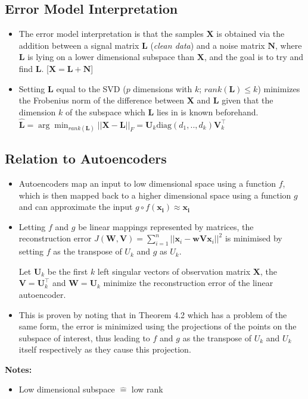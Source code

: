 \documentclass[english]{latex4ei/latex4ei_sheet}
\begin{document}
\begin{sectionbox}
\subsection{Error Model Interpretation}
\begin{itemize}
\item The error model interpretation is that the samples $\mathbf{X}$ is obtained via the addition between a signal matrix $\mathbf{L}$ (\emph{clean data}) and a noise matrix $\mathbf{N}$, where $\mathbf{L}$ is lying on a lower dimensional subspace than $\mathbf{X}$, and the goal is to try and find $\mathbf{L}$.
[$\mathbf{X}=\mathbf{L}+\mathbf{N}$]
\item Setting $\mathbf{L}$ equal to the SVD ($p$ dimensions with $k$; $rank(\mathbf{L})\le k$) minimizes the Frobenius norm of the difference between $\mathbf{X}$ and $\mathbf{L}$ given that the dimension $k$ of the subspace which $\mathbf{L}$ lies in is known beforehand. \\
$ \hat{\mathbf{L}}=\arg\min_{rank(\mathbf{L})}||\mathbf{X}-\mathbf{L}||_F=\mathbf{U}_k\mathrm{diag}(d_1,..,d_k)\mathbf{V}_k^{\top}$
\end{itemize}

\subsection{Relation to Autoencoders}
\begin{itemize}
    \item Autoencoders map an input to low dimensional space using a function $f$, which is then mapped back to a higher dimensional space using a function $g$ and can approximate the input $g\circ f(\mathbf{x_i})\approx\mathbf{x_i}$
\item Letting $f$ and $g$ be linear mappings represented by matrices, the reconstruction error $J(\mathbf{W,V})=\sum_{i=1}^n||\mathbf{x}_i-\mathbf{wVx}_i||^2$ is minimised by setting $f$ as the transpose of $U_k$ and $g$ as $U_k$.
\begin{emphbox}
    Let $\mathbf{U}_k$ be the first $k$ left singular vectors of observation matrix $\mathbf{X}$, the $\mathbf{V}=\mathbf{U}_k^{\top}$ and $\mathbf{W}=\mathbf{U}_k$ minimize the reconstruction error of the linear autoencoder.
\end{emphbox}
\item This is proven by noting that in Theorem 4.2 which has a problem of the same form, the error is minimized using the projections of the points on the subspace of interest, thus leading to $f$ and $g$ as the transpose of $U_k$ and $U_k$ itself respectively as they cause this projection.

\end{itemize}
\end{sectionbox}
\textbf{Notes:}
\begin{itemize}
    \item Low dimensional subspace $\hat{=}$ low rank
\end{itemize}
\end{document}
